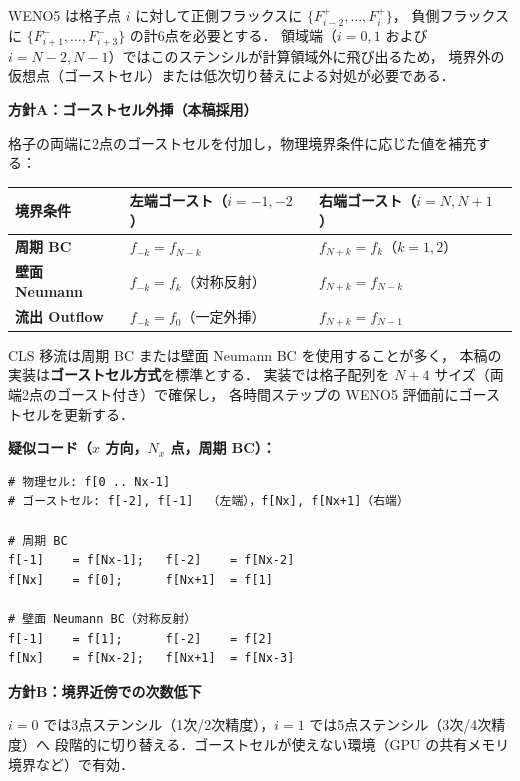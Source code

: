 WENO5 は格子点 $i$ に対して正側フラックスに $\{F^+_{i-2},\ldots,F^+_i\}$，
負側フラックスに $\{F^-_{i+1},\ldots,F^-_{i+3}\}$ の計6点を必要とする．
領域端（$i=0,1$ および $i=N-2,N-1$）ではこのステンシルが計算領域外に飛び出るため，
境界外の仮想点（ゴーストセル）または低次切り替えによる対処が必要である．

\begin{tcolorbox}[defbox, title={境界ステンシル処理の2方針}]
\textbf{方針A：ゴーストセル外挿（本稿採用）}

格子の両端に2点のゴーストセルを付加し，物理境界条件に応じた値を補充する：

\begin{center}
\renewcommand{\arraystretch}{1.2}
\begin{tabular}{lll}
\hline
境界条件 & 左端ゴースト（$i=-1,-2$） & 右端ゴースト（$i=N,N+1$） \\
\hline
\textbf{周期 BC} & $f_{-k} = f_{N-k}$ & $f_{N+k} = f_k$（$k=1,2$） \\
\textbf{壁面 Neumann} & $f_{-k} = f_{k}$（対称反射） & $f_{N+k} = f_{N-k}$ \\
\textbf{流出 Outflow} & $f_{-k} = f_0$（一定外挿） & $f_{N+k} = f_{N-1}$ \\
\hline
\end{tabular}
\end{center}

CLS 移流は周期 BC または壁面 Neumann BC を使用することが多く，
本稿の実装は\textbf{ゴーストセル方式}を標準とする．
実装では格子配列を $N+4$ サイズ（両端2点のゴースト付き）で確保し，
各時間ステップの WENO5 評価前にゴーストセルを更新する．

\textbf{疑似コード（$x$ 方向，$N_x$ 点，周期 BC）：}
\begin{center}
\begin{minipage}{0.82\linewidth}
\begin{verbatim}
# 物理セル: f[0 .. Nx-1]
# ゴーストセル: f[-2], f[-1]  （左端），f[Nx], f[Nx+1]（右端）

# 周期 BC
f[-1]    = f[Nx-1];   f[-2]    = f[Nx-2]
f[Nx]    = f[0];      f[Nx+1]  = f[1]

# 壁面 Neumann BC（対称反射）
f[-1]    = f[1];      f[-2]    = f[2]
f[Nx]    = f[Nx-2];   f[Nx+1]  = f[Nx-3]
\end{verbatim}
\end{minipage}
\end{center}

\textbf{方針B：境界近傍での次数低下}

$i=0$ では3点ステンシル（1次/2次精度），$i=1$ では5点ステンシル（3次/4次精度）へ
段階的に切り替える．ゴーストセルが使えない環境（GPU の共有メモリ境界など）で有効．
\end{tcolorbox}

